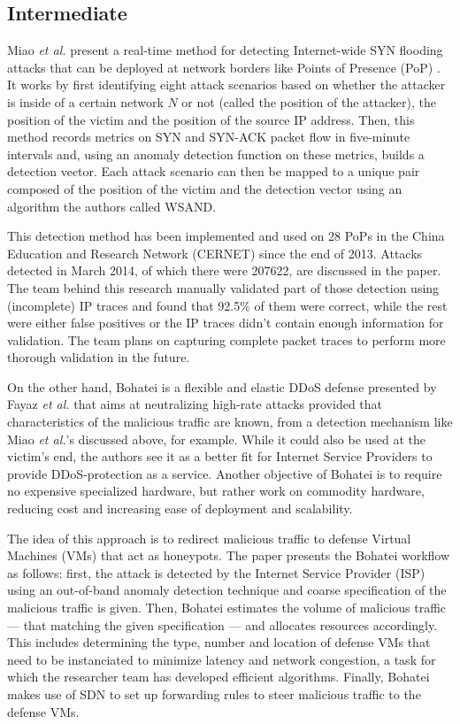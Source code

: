 \documentclass[conference]{IEEEtran}
\begin{document}
\subsection{Intermediate}
Miao \textit{et al.} present a real-time method for detecting Internet-wide SYN flooding attacks that can be deployed at network borders like Points of Presence (PoP) \cite{RealtimeDetection:Miao}. It works by first identifying eight attack scenarios based on whether the attacker is inside of a certain network $N$ or not (called the position of the attacker), the position of the victim and the position of the source IP address. Then, this method records metrics on SYN and SYN-ACK packet flow in five-minute intervals and, using an anomaly detection function on these metrics, builds a detection vector. Each attack scenario can then be mapped to a unique pair composed of the position of the victim and the detection vector using an algorithm the authors called WSAND.

This detection method has been implemented and used on 28 PoPs in the China Education and Research Network (CERNET) since the end of 2013. Attacks detected in March 2014, of which there were 207622, are discussed in the paper. The team behind this research manually validated part of those detection using (incomplete) IP traces and found that 92.5\% of them were correct, while the rest were either false positives or the IP traces didn't contain enough information for validation. The team plans on capturing complete packet traces to perform more thorough validation in the future.

On the other hand, Bohatei \cite{Bohatei:Fayaz} is a flexible and elastic DDoS defense presented by Fayaz \textit{et al.} that aims at neutralizing high-rate attacks provided that characteristics of the malicious traffic are known, from a detection mechanism like Miao \textit{et al.}'s discussed above, for example. While it could also be used at the victim's end, the authors see it as a better fit for Internet Service Providers to provide DDoS-protection as a service. Another objective of Bohatei is to require no expensive specialized hardware, but rather work on commodity hardware, reducing cost and increasing ease of deployment and scalability.

The idea of this approach is to redirect malicious traffic to defense Virtual Machines (VMs) that act as honeypots. The paper presents the Bohatei workflow as follows: first, the attack is detected by the Internet Service Provider (ISP) using an out-of-band anomaly detection technique and coarse specification of the malicious traffic is given. Then, Bohatei estimates the volume of malicious traffic --- that matching the given specification --- and allocates resources accordingly. This includes determining the type, number and location of defense VMs that need to be instanciated to minimize latency and network congestion, a task for which the researcher team has developed efficient algorithms. Finally, Bohatei makes use of SDN to set up forwarding rules to steer malicious traffic to the defense VMs.
\end{document}

